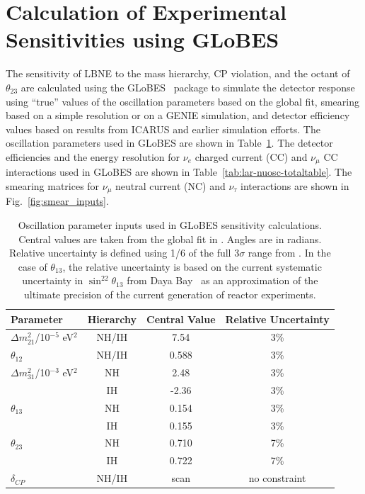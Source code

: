 \documentclass[letterpaper,11pt]{article}
\newcommand{\thetatwothree}{\mbox{$\theta_{23}$}}
\begin{document}
\section{Calculation of Experimental Sensitivities using GLoBES}
\label{sect:globes}
The sensitivity of LBNE to the mass hierarchy, CP violation, and the
octant of $\thetatwothree$ are calculated using the 
GLoBES~\cite{Huber:2004ka,Huber:2007ji}
package to simulate the detector
response using ``true'' values of the oscillation parameters based on the global
fit, smearing based on a simple resolution or on a GENIE\cite{Andreopoulos:2009zz} 
simulation, and detector efficiency values
based on results from ICARUS\cite{icarus-url} and earlier simulation efforts.  
The oscillation parameters used in GLoBES are shown in Table~\ref{tab:oscpar_inputs}.
The detector efficiencies and the energy resolution for $\nu_e$ charged current (CC) 
and $\nu_{\mu}$ CC interactions used in GLoBES are shown in 
Table~\ref{tab:lar-nuosc-totaltable}.
The smearing matrices for $\nu_{\mu}$ neutral current (NC) and $\nu_{\tau}$
interactions are shown in Fig.~\ref{fig:smear_inputs}.
%
\begin{table}[!htb]
\caption{Oscillation parameter inputs used in GLoBES sensitivity calculations.
Central values are taken from the global fit in \cite{Capozzi:2013csa}. 
Angles are in radians.
Relative uncertainty is defined using 1/6 of the full 3$\sigma$ range 
from \cite{Capozzi:2013csa}. In the case of $\theta_{13}$, the relative uncertainty
is based on the current systematic uncertainty in $\sin^22\theta_{13}$ 
from Daya Bay~\cite{An:2013zwz} as an approximation of the ultimate precision of the 
current generation of reactor experiments.}
\begin{center}
\begin{tabular}{l|c|c|c}
\hline\hline
Parameter & Hierarchy & Central Value & Relative Uncertainty \\ \hline \hline
$\Delta m^2_{21}$/10$^{-5}$ eV$^2$ & NH/IH & 7.54 & 3\% \\ \hline
$\theta_{12}$                      & NH/IH & 0.588 & 3\% \\ \hline
$\Delta m^2_{31}$/10$^{-3}$ eV$^2$ & NH    & 2.48 & 3\% \\
                                   & IH    & -2.36 & 3\% \\ \hline
$\theta_{13}$                      & NH    & 0.154 & 3\% \\
                                   & IH    & 0.155 & 3\% \\ \hline
$\theta_{23}$                      & NH    & 0.710 & 7\% \\
                                   & IH    & 0.722 & 7\% \\ \hline
$\delta_{CP}$                      & NH/IH & scan  & no constraint \\ \hline
\end{tabular}
\end{center}
\label{tab:oscpar_inputs}
\end{table}
\end{document}
